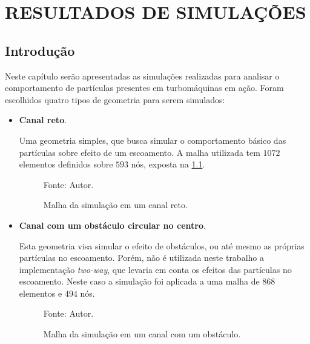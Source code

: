 \chapter{RESULTADOS DE SIMULAÇÕES}
\label{resultados}
\section{\textbf{Introdução}}
Neste capítulo serão apresentadas as simulações realizadas para analisar o comportamento de partículas presentes em turbomáquinas em ação.
Foram escolhidos quatro tipos de geometria para serem simulados:
\begin{itemize}
    \item \textbf{Canal reto}.

        Uma geometria simples, que busca simular o comportamento básico das partículas sobre efeito de um escoamento. 
        A malha utilizada tem $1072$ elementos definidos sobre $593$ nós, exposta na \ref{channel_mesh}.
        \begin{figure}[H]
            \centering
             {\raggedleft \scriptsize Fonte: Autor.}
            \caption{Malha da simulação em um canal reto.}
            \label{channel_mesh}
        \end{figure}

    \item \textbf{Canal com um obstáculo circular no centro}.

        Esta geometria visa simular o efeito de obstáculos, ou até mesmo as próprias partículas no escoamento.
        Porém, não é utilizada neste trabalho a implementação \textit{two-way}, que levaria em conta os efeitos das partículas no escoamento.
        Neste caso a simulação foi aplicada a uma malha de $868$ elementos e $494$ nós.
        \begin{figure}[H]
            \centering
             {\raggedleft \scriptsize Fonte: Autor.}
            \caption{Malha da simulação em um canal com um obstáculo.}
            \label{obstacle_mesh}
        \end{figure}


\end{itemize}
